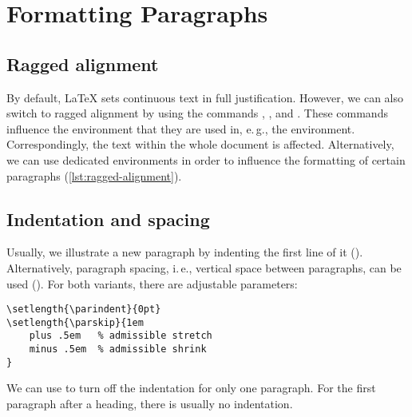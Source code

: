 \chapter{Formatting Paragraphs} %
\label{sec:formatting-paragraphs}

\section*{Ragged alignment}
\label{sec:ragged-alignment}
By default, \LaTeX{} sets continuous text in full justification. 
However, we can also switch to ragged alignment by using the commands 
, , and 
. 
These commands influence the environment that they are used in, e.\,g., the 
 environment. Correspondingly, the text within the whole 
document is affected. 
Alternatively, we can use dedicated environments in order to influence the 
formatting
of certain paragraphs (\cref{lst:ragged-alignment}).


\section*{Indentation and spacing}
\label{sec:indents-and-parskips}
Usually, we illustrate a new paragraph by indenting the first line of it 
(). 
Alternatively, paragraph spacing, i.\,e., vertical space between paragraphs, 
can be used ().
For both variants, there are adjustable parameters:
\begin{verbatim}
\setlength{\parindent}{0pt}
\setlength{\parskip}{1em
    plus .5em   % admissible stretch
    minus .5em  % admissible shrink
}
\end{verbatim}

\noindent We can use  to turn off the indentation for only one 
paragraph. 
For the first paragraph after a heading, there is usually no indentation. 

